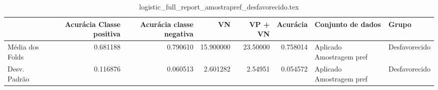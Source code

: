 \begin{table}
\centering
\caption{logistic_full_report_amostrapref_desfavorecido.tex}
\label{logistic_full_report_amostrapref_desfavorecido.tex}
\begin{tabular}{lrrrrrll}
\toprule
{} &  Acurácia Classe positiva &  Acurácia classe negativa &        VN  &  VP + VN  &  Acurácia &         Conjunto de dados &          Grupo \\
\midrule
Média dos Folds &                  0.681188 &                  0.790610 &  15.900000 &  23.50000 &  0.758014 &  Aplicado Amostragem pref &  Desfavorecido \\
Desv. Padrão    &                  0.116876 &                  0.060513 &   2.601282 &   2.54951 &  0.054572 &  Aplicado Amostragem pref &  Desfavorecido \\
\bottomrule
\end{tabular}
\end{table}
